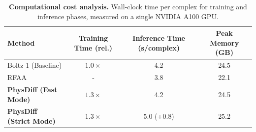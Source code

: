 \documentclass[twocolumn,10pt]{article}
\newcommand{\modelname}{PhysDiff}
\begin{document}
\begin{table}[h]
\centering
\small
\renewcommand{\arraystretch}{1.2}
\caption{\textbf{Computational cost analysis.} Wall-clock time per complex for training and inference phases, measured on a single NVIDIA A100 GPU.}
\label{tab:cost}
\begin{tabular}{lccc}
\toprule
\textbf{Method} & \textbf{Training Time} (rel.) & \textbf{Inference Time} (s/complex) & \textbf{Peak Memory} (GB) \\
\midrule
Boltz-1 (Baseline) & $1.0\times$ & 4.2 & 24.5 \\
RFAA & - & 3.8 & 22.1 \\
\textbf{\modelname{} (Fast Mode)} & $1.3\times$ & 4.2 & 24.5 \\
\textbf{\modelname{} (Strict Mode)} & $1.3\times$ & 5.0 (+0.8) & 25.2 \\
\bottomrule
\end{tabular}
\end{table}
\end{document}
